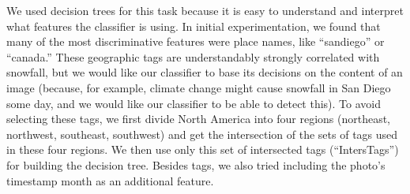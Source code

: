 We used decision trees for this task because it is easy to understand
and interpret what features the classifier is using.  In initial
experimentation, we found that many of the most discriminative
features were place names, like ``sandiego'' or ``canada.'' These
geographic tags are understandably strongly correlated with snowfall,
but we would like our classifier to base its decisions on the content
of an image (because, for example, climate change might cause snowfall
in San Diego some day, and we would like our classifier to be able to
detect this).  To avoid selecting these tags, we first divide North
America into four regions (northeast, northwest, southeast, southwest)
and get the intersection of the sets of tags used in these four
regions.  We then use only this set of intersected tags
(``IntersTags'') for building the decision tree. Besides tags, we also
tried including the photo's timestamp month as an additional feature.



